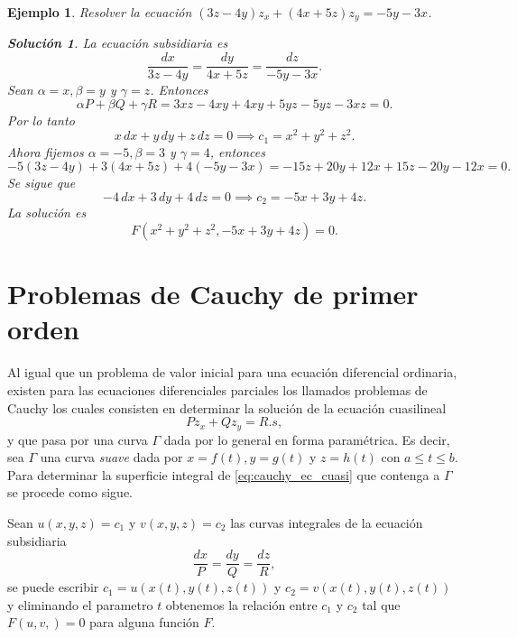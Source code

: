 \documentclass[11pt,letterpaper]{report}
\newtheorem{example}[defn]{Ejemplo}
\newtheorem*{sol}{Solución}
\newcommand\<{\langle}
\renewcommand\>{\rangle}
\begin{document}
\begin{example}
  Resolver la ecuación $(3z-4y) z_x + (4x+5z) z_y = -5y -
  3x$.
  \begin{sol}
    La ecuación subsidiaria es
    \[
    \frac{dx}{3z-4y} = \frac{dy}{4x+5z} = \frac{dz}{-5y-3x}.
    \] 
    Sean $\alpha = x, \beta = y$ y $\gamma = z$. Entonces
    \[
    \alpha P + \beta Q + \gamma R = 3xz - 4xy + 4xy + 5yz -
    5yz - 3xz = 0.
    \] Por lo tanto
    \[
    x \, dx + y \, dy + z \, dz = 0 \implies c_1 = x^2 + y^2
    + z^2.
    \] 
    Ahora fijemos $\alpha = -5, \beta = 3$ y $\gamma = 4$,
    entonces
    \[
    -5(3z-4y) + 3(4x+5z) + 4(-5y-3x) = -15z + 20y + 12x +
    15z - 20y - 12x = 0.
    \]
    Se sigue que
    \[
    -4 \, dx + 3 \, dy + 4 \, dz = 0 \implies c_2 = -5x + 3y
    + 4z.
    \] 
    La solución es
    \[
    F\left(x^2+y^2+z^2, -5x + 3y + 4z\right) = 0.
    \] 
  \end{sol}
\end{example}

\section{Problemas de Cauchy de primer orden}

Al igual que un problema de valor inicial para una ecuación
diferencial ordinaria, existen para las ecuaciones
diferenciales parciales los llamados problemas de Cauchy los
cuales consisten en determinar la solución de la ecuación
cuasilineal
\begin{equation}
  \label{eq:cauchy_ec_cuasi}
  P z_x + Q z_y = R.s,
\end{equation}
y que pasa por una curva $\Gamma$ dada por lo general en
forma paramétrica. Es decir, sea $\Gamma$ una curva
\textit{suave} dada por $x = f(t), y = g(t)$ y $z = h(t)$
con $a \leq t \leq b$. Para determinar la superficie
integral de \ref{eq:cauchy_ec_cuasi} que contenga a $\Gamma$
se procede como sigue.

Sean $u(x,y,z) = c_1$ y $v(x,y,z) = c_2$ las curvas
integrales de la ecuación subsidiaria
\[
\frac{dx}{P} = \frac{dy}{Q} = \frac{dz}{R},
\] 
se puede escribir $c_1 = u(x(t), y(t), z(t))$ y $c_2 =
v(x(t),y(t),z(t))$ y eliminando el parametro $t$ obtenemos
la relación entre $c_1$ y $c_2$ tal que $F(u,v,) = 0$ para
alguna función $F$.
\end{document}
